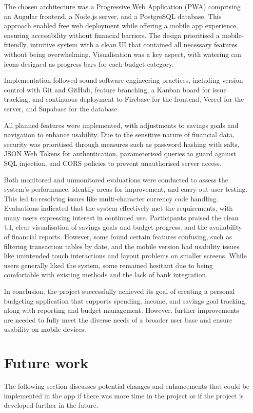 \documentclass{l4proj}
\begin{document}
The chosen architecture was a Progressive Web Application (PWA) comprising an Angular frontend, a Node.js server, and a PostgreSQL database. This approach enabled free web deployment while offering a mobile app experience, ensuring accessibility without financial barriers. The design prioritised a mobile-friendly, intuitive system with a clean UI that contained all necessary features without being overwhelming. Visualisation was a key aspect, with watering can icons designed as progress bars for each budget category.

Implementation followed sound software engineering practices, including version control with Git and GitHub, feature branching, a Kanban board for issue tracking, and continuous deployment to Firebase for the frontend, Vercel for the server, and Supabase for the database.

All planned features were implemented, with adjustments to savings goals and navigation to enhance usability. Due to the sensitive nature of financial data, security was prioritised through measures such as password hashing with salts, JSON Web Tokens for authentication, parameterised queries to guard against SQL injection, and CORS policies to prevent unauthorised server access.

Both monitored and unmonitored evaluations were conducted to assess the system’s performance, identify areas for improvement, and carry out user testing. This led to resolving issues like multi-character currency code handling. Evaluations indicated that the system effectively met the requirements, with many users expressing interest in continued use. Participants praised the clean UI, clear visualisation of savings goals and budget progress, and the availability of financial reports. However, some found certain features confusing, such as filtering transaction tables by date, and the mobile version had usability issues like unintended touch interactions and layout problems on smaller screens. While users generally liked the system, some remained hesitant due to being comfortable with existing methods and the lack of bank integration.

In conclusion, the project successfully achieved its goal of creating a personal budgeting application that supports spending, income, and savings goal tracking, along with reporting and budget management. However, further improvements are needed to fully meet the diverse needs of a broader user base and ensure usability on mobile devices.


\section{Future work}
The following section discusses potential changes and enhancements that could be implemented in the app if there was more time in the project or if the project is developed further in the future.
\end{document}
